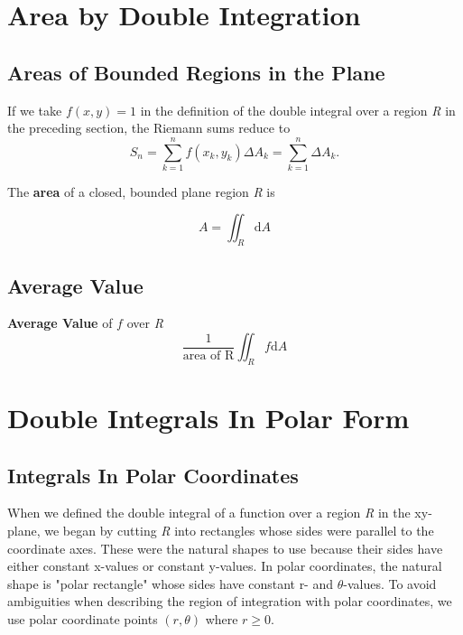 \documentclass[12pt,a4paper,draft]{article}
\newenvironment{definition}{\begin{definitionbox}}{\end{definitionbox}\vspace{1\baselineskip}}
\newenvironment{mynote}{\vspace{1\baselineskip}\begin{note}}{\end{note}\vspace{1\baselineskip}}
\begin{document}
\section{Area by Double Integration}


\subsection{Areas of Bounded Regions in the Plane}

If we take \(f(x,y) = 1\) in the definition of the double integral over a region \textit{R} in the preceding section, the Riemann sums reduce to 
\[S_n = \sum_{k=1}^{n} f(x_k,y_k) \Delta A_k = \sum_{k=1}^{n} \Delta A_k.\]

\begin{definition}
    The \textbf{area} of a closed, bounded plane region \textit{R} is 

    \[A = \iint_R \mathrm{d}A\]
\end{definition}


\subsection{Average Value}


\begin{mynote}
    \textbf{Average Value } of \(f\) over \textit{R} \[\frac{1}{\text{area of R}  } \iint_R f \mathrm{d}A\] 


\end{mynote}

\section{Double Integrals In Polar Form}


\subsection{Integrals In Polar Coordinates}


When we defined the double integral of a function over a region \textit{R} in the xy-plane, we began by cutting \textit{R} into rectangles whose sides were parallel to the coordinate axes. These were the natural shapes to use because their sides have either constant x-values or constant y-values. In polar coordinates, the natural shape is "polar rectangle" whose sides have constant r- and \(\theta\)-values.
To avoid ambiguities when describing the region of integration with polar coordinates, we use polar coordinate points \((r, \theta)\) where \(r \geq 0\).
\end{document}
